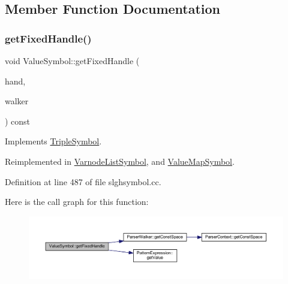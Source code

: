 \subsection{Member Function Documentation}
\mbox{\label{class_value_symbol_a8eeefeaf224149a7f81a301dc505a705}} 
\subsubsection{\texorpdfstring{getFixedHandle()}{getFixedHandle()}}
{\footnotesize\ttfamily void Value\+Symbol\+::get\+Fixed\+Handle (\begin{DoxyParamCaption}\item[{\mbox{\hyperlink{struct_fixed_handle}{Fixed\+Handle}} \&}]{hand,  }\item[{\mbox{\hyperlink{class_parser_walker}{Parser\+Walker}} \&}]{walker }\end{DoxyParamCaption}) const\hspace{0.3cm}{\ttfamily [virtual]}}



Implements \mbox{\hyperlink{class_triple_symbol_aa71f48c79a2bee73e97fdfb8163b4e46}{Triple\+Symbol}}.



Reimplemented in \mbox{\hyperlink{class_varnode_list_symbol_aa4366d8c21b4969bff3cefde9893b25c}{Varnode\+List\+Symbol}}, and \mbox{\hyperlink{class_value_map_symbol_a78aaab9818d7d20cbae621581b99894c}{Value\+Map\+Symbol}}.



Definition at line 487 of file slghsymbol.\+cc.

Here is the call graph for this function\+:
\nopagebreak
\begin{figure}[H]
\begin{center}
\leavevmode
\includegraphics[width=350pt]{class_value_symbol_a8eeefeaf224149a7f81a301dc505a705_cgraph}
\end{center}
\end{figure}
\mbox{\label{class_value_symbol_aa35d8513d3b3cb589d05128fb46f23fc}} 
